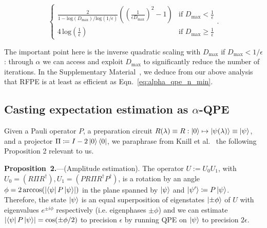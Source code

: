 \documentclass[twocolumn,
 reprint,
 amsmath,amssymb,
 aps,
 floatfix,
superscriptaddress
]{revtex4-1}
\begin{document}
\begin{equation}\label{eq:alpha_qpe_n_min}
\begin{cases}
\frac{2}{1-\text{log}(D_{\text{max}})/\text{log}(1/\epsilon)}((\frac{1}{\epsilon D_{\text{max}}})^{2}-1) & \text{if }D_{\text{max}}<\frac{1}{\epsilon}\\[5pt]
4\,\text{log}(\frac{1}{\epsilon}) & \text{if }D_{\text{max}}\geq\frac{1}{\epsilon}
\end{cases}.
\end{equation}

The important point here is the inverse quadratic scaling with $D_{\text{max}}$ if $D_{\text{max}}<1/\epsilon$: through $\alpha$ we can access and exploit $D_{\text{max}}$ to significantly reduce the number
of iterations. In the Supplementary Material~\cite{SuppMat}, we deduce from our above analysis that RFPE is at least as efficient as Eqn.~\ref{eq:alpha_qpe_n_min}.

\subsection{Casting expectation estimation as $\alpha$-QPE \label{subsec:Casting expectation estimation} }

Given a Pauli operator $P$, a preparation circuit $R(\lambda)\equiv R:\Ket{0}\mapsto\Ket{\psi(\lambda)}\equiv\Ket{\psi}$,
and a projector $\Pi\coloneqq I-2\Ket{0}\Bra{0}$, we paraphrase from Knill
et al.~\cite{Knill2007} the following Proposition 2 relevant to us. 

\vspace{2 mm}
\textbf{Proposition~2.}---(Amplitude estimation).
The operator $U:=U_{0}U_{1}$, with $U_{0}=(R\Pi R^{\dagger}),U_{1}=(PR\Pi R^{\dagger}P^{\dagger})$,
is a rotation by an angle $\phi=2\,\text{arccos}(\left|\Bra{\psi}P\Ket{\psi}\right|)$
in the plane spanned by $\Ket{\psi}$ and $\Ket{\psi'}\coloneqq P\Ket{\psi}$.
Therefore, the state $\Ket{\psi}$ is an equal superposition of eigenstates $\Ket{\pm \phi}$
of $U$ with eigenvalues $e^{\pm i\phi}$ respectively (i.e. eigenphases $\pm\phi$)
and we can estimate $\left|\Bra{\psi}P\Ket{\psi}\right|=\text{cos}(\pm\phi/2)$
to precision $\epsilon$ by running QPE on $\Ket{\psi}$ to precision
$2\epsilon$. %
\vspace{2 mm}
\end{document}
